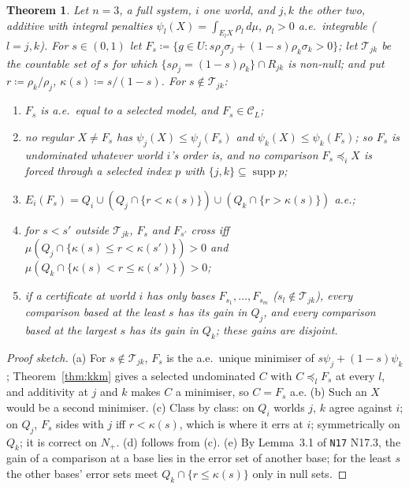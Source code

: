 \documentclass[11pt]{article}
\newtheorem{theorem}{Theorem}[section]
\theoremstyle{definition}
\theoremstyle{remark}
\newcommand{\C}{\mathcal C}
\newcommand{\supp}{\operatorname{supp}}
\newcommand{\src}[1]{\texttt{#1}}
\begin{document}
\begin{theorem}\label{thm:K24}
Let $n=3$, a full system, $i$ one world, and $j,k$ the other two, additive with integral penalties $\psi_l(X)=\int_{E_lX}\rho_l\,d\mu$, $\rho_l>0$ a.e.\ integrable ($l=j,k$). For $s\in(0,1)$ let $F_s\coloneqq\{g\in U:s\rho_j\sigma_j+(1-s)\rho_k\sigma_k>0\}$; let $\mathcal T_{jk}$ be the countable set of $s$ for which $\{s\rho_j=(1-s)\rho_k\}\cap R_{jk}$ is non-null; and put $r\coloneqq\rho_k/\rho_j$, $\kappa(s)\coloneqq s/(1-s)$. For $s\notin\mathcal T_{jk}$:
\begin{enumerate}[leftmargin=*,label=(\alph*)]
\item $F_s$ is a.e.\ equal to a selected model, and $F_s\in\C_L$;
\item no regular $X\ne F_s$ has $\psi_j(X)\le\psi_j(F_s)$ and $\psi_k(X)\le\psi_k(F_s)$; so $F_s$ is undominated whatever world $i$'s order is, and no comparison $F_s\preceq_iX$ is forced through a selected index $p$ with $\{j,k\}\subseteq\supp p$;
\item $E_i(F_s)=Q_i\cup(Q_j\cap\{r<\kappa(s)\})\cup(Q_k\cap\{r>\kappa(s)\})$ a.e.;
\item for $s<s'$ outside $\mathcal T_{jk}$, $F_s$ and $F_{s'}$ cross iff $\mu(Q_j\cap\{\kappa(s)\le r<\kappa(s')\})>0$ and $\mu(Q_k\cap\{\kappa(s)<r\le\kappa(s')\})>0$;
\item if a certificate at world $i$ has only bases $F_{s_1},\dots,F_{s_m}$ ($s_l\notin\mathcal T_{jk}$), every comparison based at the least $s$ has its gain in $Q_j$, and every comparison based at the largest $s$ has its gain in $Q_k$; these gains are disjoint.
\end{enumerate}
\end{theorem}
\begin{proof}[Proof sketch]
(a) For $s\notin\mathcal T_{jk}$, $F_s$ is the a.e.\ unique minimiser of $s\psi_j+(1-s)\psi_k$; Theorem~\ref{thm:kkm} gives a selected undominated $C$ with $C\preceq_lF_s$ at every $l$, and additivity at $j$ and $k$ makes $C$ a minimiser, so $C=F_s$ a.e. (b) Such an $X$ would be a second minimiser. (c) Class by class: on $Q_i$ worlds $j$, $k$ agree against $i$; on $Q_j$, $F_s$ sides with $j$ iff $r<\kappa(s)$, which is where it errs at $i$; symmetrically on $Q_k$; it is correct on $N_+$. (d) follows from (c). (e) By Lemma~3.1 of \src{N17} N17.3, the gain of a comparison at a base lies in the error set of another base; for the least $s$ the other bases' error sets meet $Q_k\cap\{r\le\kappa(s)\}$ only in null sets.
\end{proof}
\end{document}
